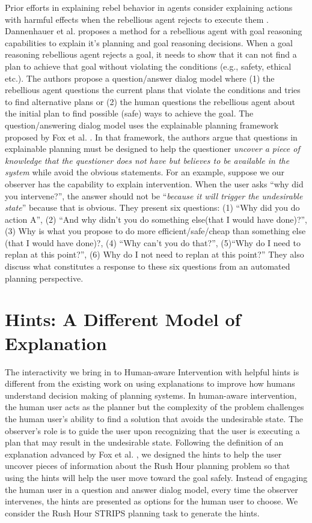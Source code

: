 Prior efforts in explaining rebel behavior in agents consider explaining actions with harmful effects when the rebellious agent rejects to execute them \cite{briggs2015,greggsmith2015}.
Dannenhauer et al. \citeyear{dannenhauer2018explaining} proposes a method for a rebellious agent with goal reasoning capabilities to explain it's planning and goal reasoning decisions. 
When a goal reasoning rebellious agent rejects a goal, it needs to show that it can not find a plan to achieve that goal without violating the conditions (e.g., safety, ethical etc.).
The authors propose a question/answer dialog model where (1) the rebellious agent questions the current plans that violate the conditions and tries to find alternative plans or (2) the human questions the rebellious agent about the initial plan to find possible (safe) ways to achieve the goal.
The question/answering dialog model uses the explainable planning framework proposed by Fox et al. \cite{fox2017xai}.
In that framework, the authors argue that questions in explainable planning must be designed to help the questioner \textit{uncover a piece of knowledge that the questioner does not have but believes to be available in the system} while avoid the obvious statements.  
For an example, suppose we our observer has the capability to explain intervention. When the user asks ``why did you intervene?'', the answer should not be ``\textit{because it will trigger the undesirable state}'' because that is obvious.
They present six questions: (1) ``Why did you do action A'', (2) ``And why didn’t you do something else(that I would have done)?'', (3) Why   is   what   you   propose   to   do   more   efficient/safe/cheap than something else (that I would have done)?, (4) ``Why can’t you do that?'', (5)``Why do I need to replan at this point?'', (6) Why do I not need to replan at this point?''
They also discuss what constitutes a response to these six questions from an automated planning perspective.


\section{Hints: A Different Model of Explanation}
The interactivity we bring in to Human-aware Intervention with helpful hints is different from the existing work on using explanations to improve how humans understand decision making of planning systems.
In human-aware intervention, the human user acts as the planner but the complexity of the problem challenges the human user's ability to find a solution that avoids the undesirable state.
The observer's role is to guide the user upon recognizing that the user is executing a plan that may result in the undesirable state.
Following the definition of an explanation advanced by Fox et al. \citeyear{fox2017xai}, we designed the hints to help the user uncover pieces of information about the Rush Hour planning problem so that using the hints will help the user move toward the goal safely.
Instead of engaging the human user in a question and answer dialog model, every time the observer intervenes, the hints are presented as options for the human user to choose.
We consider the Rush Hour STRIPS planning task to generate the hints.


